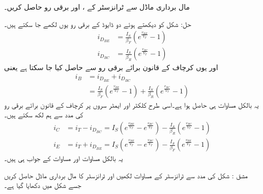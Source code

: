 مال برداری ماڈل سے   ٹرانزسٹر کے  ، اور  برقی رو حاصل کریں۔

حل:	شکل   کو دیکھتے ہوئے دو ڈایوڈ کے برقی رو یوں لکھے جا سکتے ہیں۔
\begin{align*}
i_{D_{BE}}&=\frac{I_S}{\beta_F} \left(e^{\frac{v_{BE}}{V_T}}-1 \right )\\
i_{D_{BC}}&=\frac{I_S}{\beta_R} \left(e^{\frac{v_{BC}}{V_T}}-1 \right )
\end{align*}
اور یوں کرچاف کے قانون برائے برقی رو سے   حاصل کیا جا سکتا ہے یعنی
\begin{align}
i_B&=i_{D_{BE}} + i_{D_{BC}}\\
&=\frac{I_S}{\beta_F} \left(e^{\frac{v_{BE}}{V_T}}-1 \right ) +\frac{I_S}{\beta_R} \left(e^{\frac{v_{BC}}{V_T}}-1 \right )
\end{align}
یہ بالکل مساوات  ہی حاصل ہوا ہے۔اسی طرح کلکٹر  اور ایمٹر سروں پر کرچاف کے قانون برائے برقی رو کی مدد سے ہم لکھ سکتے ہیں۔
\begin{align}
i_C&=i_T-i_{D_{BC}}=I_S \left(e^{\frac{v_{BE}}{V_T}}-e^{\frac{v_{BC}}{V_T}} \right )-\frac{I_S}{\beta_R} \left(e^{\frac{v_{BC}}{V_T}}-1 \right )\\
i_E&=i_T+i_{D_{BE}} =I_S \left(e^{\frac{v_{BE}}{V_T}}-e^{\frac{v_{BC}}{V_T}} \right )-\frac{I_S}{\beta_F} \left(e^{\frac{v_{BE}}{V_T}}-1 \right )
\end{align}
یہ بالکل مساوات  اور مساوات   کے جواب ہی ہیں۔ 


مشق : شکل  کی مدد سے  ٹرانزسٹر کے مساوات لکھیں اور ٹرانزسٹر کا مال برداری ماڈل حاصل کریں جسے شکل  میں دکھایا گیا ہے۔

